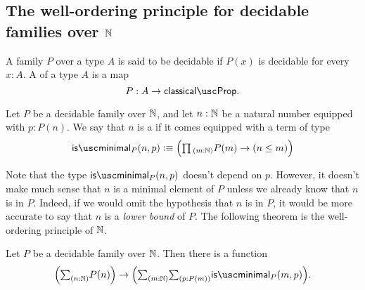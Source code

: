\subsection{The well-ordering principle for decidable families over \texorpdfstring{${\mathbb{N}}$}{ℕ}}

\begin{defn}
  A family $P$ over a type $A$ is said to be decidable if $P(x)$ is decidable for every $x:A$. A  of a type $A$ is a map
  \begin{equation*}
    P:A\to\classicalprop.
  \end{equation*}
\end{defn}

\begin{defn}
  Let $P$ be a decidable family over ${\mathbb{N}}$, and let $n:{\mathbb{N}}$ be a natural number equipped with $p:P(n)$. We say that $n$ is a  if it comes equipped with a term of type
  \begin{equation*}
    \isminimal_P(n,p)\defeq \Big(\prd{m:\N}P(m)\to (n\leq m)\Big)
  \end{equation*}
\end{defn}

Note that the type $\isminimal_P(n,p)$ doesn't depend on $p$. However, it doesn't make much sense that $n$ is a minimal element of $P$ unless we already know that $n$ is in $P$. Indeed, if we would omit the hypothesis that $n$ is in $P$, it would be more accurate to say that $n$ is a \emph{lower bound} of $P$. The following theorem is the well-ordering principle of ${\mathbb{N}}$. 

\begin{thm}
  Let $P$ be a decidable family over ${\mathbb{N}}$. Then there is a function
  \begin{equation*}
    \Big(\sm{n:\N}P(n)\Big)\to\Big(\sm{m:\N}{p:P(m)}\isminimal_P(m,p)\Big).
  \end{equation*}
\end{thm}

